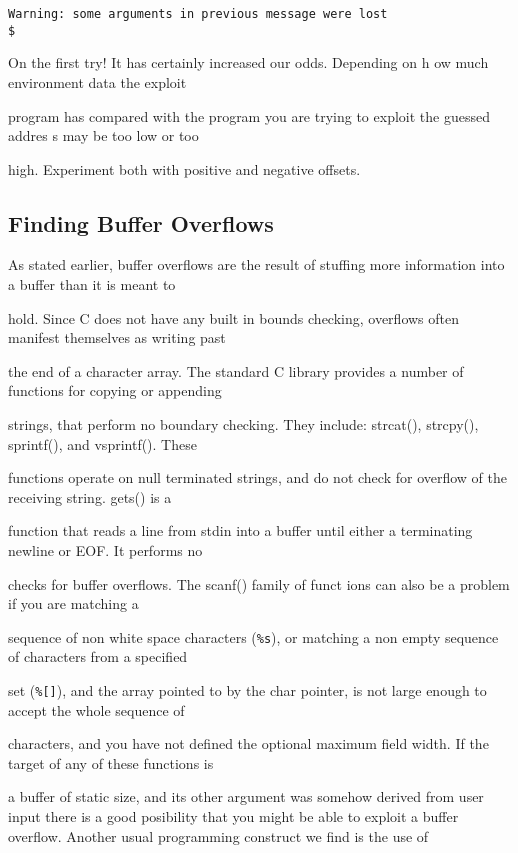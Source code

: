 \documentclass[10pt]{article}
\begin{document}
{\begin{CJK}{UTF8}{bsmi}
\begin{verbatim}
Warning: some arguments in previous message were lost
$
\end{verbatim}
\end{CJK}

On the first try! It has certainly increased our odds. Depending on h ow much environment data the exploit 

program has compared with the program you are trying to exploit the guessed addres s may be too low or too 

high. Experiment both with positive and negative offsets. 

\subsection{Finding Buffer Overflows}

As stated earlier, buffer overflows are the result of stuffing more information into a buffer than it is meant to 

hold. Since C does not have any built in bounds checking, overflows often manifest themselves as writing past 

the end of a character array. The standard C library provides a number of functions for copying or appending  

strings, that perform no boundary checking. They include: strcat(), strcpy(), sprintf(), and vsprintf(). These 

functions operate on null terminated strings, and do not check for overflow of the receiving string. gets() is a 

function that reads a line from stdin into a buffer until either a terminating newline or EOF. It performs no 

checks for buffer overflows. The scanf() family of funct ions can also be a problem if you are matching a 

sequence of non white space characters (\verb+%s+),  or matching a non empty sequence of characters from a specified 

set (\verb+%[]+), and the array pointed to by the char pointer, is not large enough to accept the whole sequence of 

characters,  and you have not defined the optional maximum field width. If the target of any of these functions is 

a buffer of static size, and its other argument was somehow derived from user input there is a good posibility that you might be able to exploit a buffer overflow. Another usual programming construct we find is the use of 

}
\end{document}
